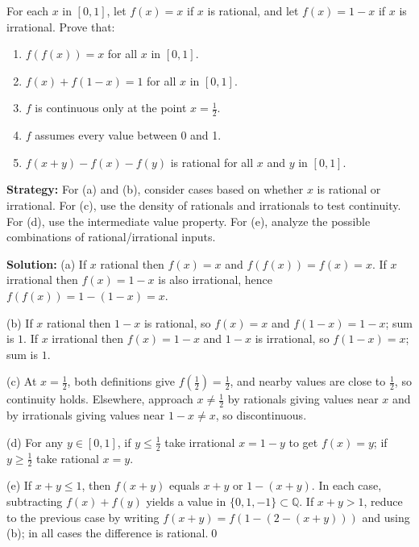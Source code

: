 \begin{problembox}
\begin{problemstatement}
For each \( x \) in \([0, 1]\), let \( f(x) = x \) if \( x \) is rational, and let \( f(x) = 1 - x \) if \( x \) is irrational. Prove that:
\begin{enumerate}[label=(\alph*)]
\item \( f(f(x)) = x \) for all \( x \) in \([0, 1]\).
\item \( f(x) + f(1 - x) = 1 \) for all \( x \) in \([0, 1]\).
\item \( f \) is continuous only at the point \( x = \frac{1}{2} \).
\item \( f \) assumes every value between 0 and 1.
\item \( f(x + y) - f(x) - f(y) \) is rational for all \( x \) and \( y \) in \([0, 1]\).
\end{enumerate}
\end{problemstatement}
\end{problembox}

\noindent\textbf{Strategy:} For (a) and (b), consider cases based on whether $x$ is rational or irrational. For (c), use the density of rationals and irrationals to test continuity. For (d), use the intermediate value property. For (e), analyze the possible combinations of rational/irrational inputs.

\bigskip\noindent\textbf{Solution:}
(a) If $x$ rational then $f(x)=x$ and $f(f(x))=f(x)=x$. If $x$ irrational then $f(x)=1-x$ is also irrational, hence $f(f(x))=1-(1-x)=x$.

(b) If $x$ rational then $1-x$ is rational, so $f(x)=x$ and $f(1-x)=1-x$; sum is $1$. If $x$ irrational then $f(x)=1-x$ and $1-x$ is irrational, so $f(1-x)=x$; sum is $1$.

(c) At $x=\tfrac12$, both definitions give $f(\tfrac12)=\tfrac12$, and nearby values are close to $\tfrac12$, so continuity holds. Elsewhere, approach $x\ne\tfrac12$ by rationals giving values near $x$ and by irrationals giving values near $1-x\ne x$, so discontinuous.

(d) For any $y\in[0,1]$, if $y\le \tfrac12$ take irrational $x=1-y$ to get $f(x)=y$; if $y\ge \tfrac12$ take rational $x=y$.

(e) If $x+y\le 1$, then $f(x+y)$ equals $x+y$ or $1-(x+y)$. In each case, subtracting $f(x)+f(y)$ yields a value in $\{0,1,-1\}\subset \mathbb{Q}$. If $x+y>1$, reduce to the previous case by writing $f(x+y)=f(1-(2-(x+y)))$ and using (b); in all cases the difference is rational.\qed



